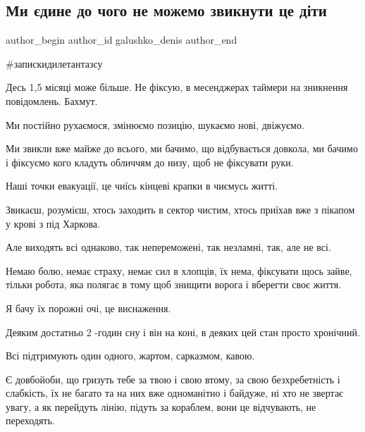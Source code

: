  
 
 
 
 

\subsection{Ми єдине до чого не можемо звикнути це діти}
\label{sec:28_10_2022.fb.galushko_denis.1.mi__dine_do_chogo_ne}

\ifcmt
 author_begin
   author_id galushko_denis
 author_end
\fi

\#запискидилетантазсу

Десь 1,5 місяці може більше. Не фіксую, в месенджерах таймери на зникнення
повідомлень.  Бахмут.

Ми постійно рухаємося, змінюємо позицію, шукаємо нові, двіжуємо. 

Ми звикли вже майже до всього, ми бачимо, що відбувається довкола, ми бачимо і
фіксуємо кого кладуть обличчям до низу, щоб не фіксувати руки.  

Наші точки евакуації, це чиїсь кінцеві крапки в чиємусь житті. 

Звикаєш, розумієш, хтось заходить в сектор чистим, хтось приїхав вже з пікапом
у крові з під Харкова. 

Але виходять всі однаково, так непереможені, так незламні, так, але не всі.

Немаю болю, немає страху, немає сил в хлопців, їх нема, фіксувати щось зайве,
тільки робота, яка полягає в тому щоб знищити ворога і вберегти своє життя.

Я бачу їх порожні очі, це виснаження.

Деяким достатньо 2 -годин сну і він на коні, в деяких цей стан просто
хронічний.  

Всі підтримують один одного, жартом, сарказмом, кавою. 

Є довбойоби, що гризуть тебе за твою і свою втому, за свою безхребетність і
слабкість, їх не багато та на них вже одноманітно і байдуже, ні хто не звертає
увагу, а як перейдуть лінію, підуть за кораблем, вони це відчувають, не
переходять.

